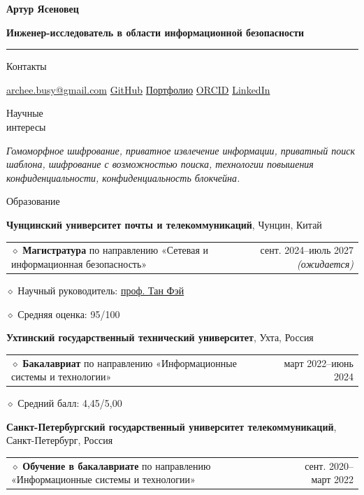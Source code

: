 \documentclass[11pt,a4paper]{article}
\makeatletter
\newcommand{\cvrow}[2]{%
  \noindent
  \begin{minipage}[t]{0.145\textwidth}
    \vspace{0pt}%
    \raggedright
    \fontsize{10.5}{12.5}\selectfont
    #1
  \end{minipage}%
  \hfill
  \begin{minipage}[t]{0.835\textwidth}
    \vspace{0pt}%
    #2
  \end{minipage}\par
}
\newcommand{\eduentry}[2]{%
  \noindent
  \begin{tabularx}{\linewidth}
    {@{}X@{\hspace{0.8em}}r@{}}
    #1 & \small #2
  \end{tabularx}\par
  \vspace{0.15em}
}
\newcommand{\edudetail}[1]{%
  \noindent\hspace*{1.15em}$\diamond$ #1\par
}
\makeatother
\begin{document}
{\fontsize{24}{28}\selectfont\bfseries Артур Ясеновец}\par
\vspace{0.08em}
{\large\bfseries Инженер-исследователь в области информационной безопасности}\par
\vspace{0.22em}
\hrule
\vspace{0.55em}

\cvrow{Контакты}{%
  \href{mailto:archee.busy@gmail.com}{archee.busy@gmail.com}
  \;\textbullet\;
  \href{https://github.com/iasenovets}{GitHub}
  \;\textbullet\;
  \href{https://iasenovets.github.io/}{Портфолио}
  \;\textbullet\;
  \href{https://orcid.org/0009-0008-0008-3746}{ORCID}
  \;\textbullet\;
  \href{https://linkedin.com/in/iasenovets}{LinkedIn}
}

\vspace{0.55em}

\cvrow{Научные\\интересы}{%
  \textit{Гомоморфное шифрование, приватное извлечение информации,
  приватный поиск шаблона, шифрование с возможностью поиска,
  технологии повышения конфиденциальности, конфиденциальность блокчейна.}
}

\vspace{0.75em}

\cvrow{Образование}{%
  \raggedright

  \textbf{Чунцинский университет почты и телекоммуникаций},
  Чунцин, Китай\par
  \vspace{0.12em}

  \eduentry
    {$\diamond$ \textbf{Магистратура} по направлению «Сетевая и информационная безопасность»}
    {сент. 2024--июль 2027 \textit{(ожидается)}}

  \edudetail{Научный руководитель:
    \href{https://faculty.cqupt.edu.cn/tangfei/en/index.htm}{проф. Тан Фэй}}
  \edudetail{Средняя оценка: 95/100}

  \vspace{0.48em}

  \textbf{Ухтинский государственный технический университет},
  Ухта, Россия\par
  \vspace{0.12em}

  \eduentry
    {$\diamond$ \textbf{Бакалавриат} по направлению «Информационные системы и технологии»}
    {март 2022--июнь 2024}

  \edudetail{Средний балл: 4,45/5,00}

  \vspace{0.48em}

  \textbf{Санкт-Петербургский государственный университет телекоммуникаций},
  Санкт-Петербург, Россия\par
  \vspace{0.12em}

  \eduentry
    {$\diamond$ \textbf{Обучение в бакалавриате} по направлению
    «Информационные системы и технологии»}
    {сент. 2020--март 2022}
}
\end{document}
